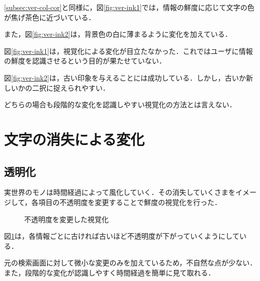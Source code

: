 \ref{subsec:ver-col-cor}と同様に，図\ref{fig:ver-ink1}では，情報の鮮度に応じて文字の色が焦げ茶色に近づいている．

また，図\ref{fig:ver-ink2}は，背景色の白に薄まるように変化を加えている．

図\ref{fig:ver-ink1}は，視覚化による変化が目立たなかった．これではユーザに情報の鮮度を認識させるという目的が果たせていない．

図\ref{fig:ver-ink2}は，古い印象を与えることには成功している．しかし，古いか新しいかの二択に捉えられやすい．

どちらの場合も段階的な変化を認識しやすい視覚化の方法とは言えない．

\section{文字の消失による変化}
\label{sec:ver-character}

\subsection{透明化}
\label{subsec:ver-chr-trp}

実世界のモノは時間経過によって風化していく．その消失していくさまをイメージして，各項目の不透明度を変更することで鮮度の視覚化を行った．

\begin{figure}[htbp]
  \begin{center}
  \end{center}
  \caption{不透明度を変更した視覚化}
  \label{fig:ver-transparence}
\end{figure}

図\ref{fig:ver-transparence}は，各情報ごとに古ければ古いほど不透明度が下がっていくようにしている．

元の検索画面に対して微小な変更のみを加えているため，不自然な点が少ない．また，段階的な変化が認識しやすく時間経過を簡単に見て取れる．

